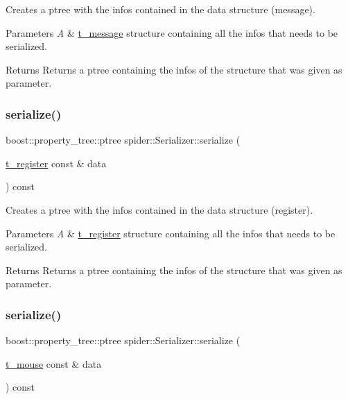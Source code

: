 Creates a ptree with the infos contained in the data structure (message). 


\begin{DoxyParams}{Parameters}
{\em A} & \hyperlink{structt__message}{t\+\_\+message} structure containing all the infos that needs to be serialized. \\
\hline
\end{DoxyParams}
\begin{DoxyReturn}{Returns}
Returns a ptree containing the infos of the structure that was given as parameter. 
\end{DoxyReturn}
\mbox{\label{classspider_1_1_serializer_adca362ee0cd4c86234dd3f85fc62390b}} 
\subsubsection{\texorpdfstring{serialize()}{serialize()}\hspace{0.1cm}{\footnotesize\ttfamily [2/4]}}
{\footnotesize\ttfamily boost\+::property\+\_\+tree\+::ptree spider\+::\+Serializer\+::serialize (\begin{DoxyParamCaption}\item[{\hyperlink{structt__register}{t\+\_\+register} const \&}]{data }\end{DoxyParamCaption}) const}



Creates a ptree with the infos contained in the data structure (register). 


\begin{DoxyParams}{Parameters}
{\em A} & \hyperlink{structt__register}{t\+\_\+register} structure containing all the infos that needs to be serialized. \\
\hline
\end{DoxyParams}
\begin{DoxyReturn}{Returns}
Returns a ptree containing the infos of the structure that was given as parameter. 
\end{DoxyReturn}
\mbox{\label{classspider_1_1_serializer_a758144d21b9e7334b9a45736095e175f}} 
\subsubsection{\texorpdfstring{serialize()}{serialize()}\hspace{0.1cm}{\footnotesize\ttfamily [3/4]}}
{\footnotesize\ttfamily boost\+::property\+\_\+tree\+::ptree spider\+::\+Serializer\+::serialize (\begin{DoxyParamCaption}\item[{\hyperlink{structt__mouse}{t\+\_\+mouse} const \&}]{data }\end{DoxyParamCaption}) const}



